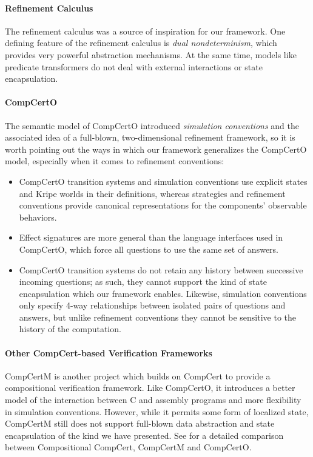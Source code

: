 \documentclass[acmsmall,nonacm]{acmart}
\begin{document}
\paragraph{Refinement Calculus}

The refinement calculus \cite{refcal} was a source of inspiration for our framework.
One defining feature of the refinement calculus is \emph{dual nondeterminism},
which provides very powerful abstraction mechanisms.
At the same time, models like predicate transformers
do not deal with external interactions or state encapsulation.

\paragraph{CompCertO}

The semantic model of CompCertO introduced \emph{simulation conventions}
and the associated idea of a full-blown, two-dimensional refinement framework,
so it is worth pointing out the ways in which our framework generalizes the CompCertO model,
especially when it comes to refinement conventions:
\begin{itemize}
  \item CompCertO transition systems and simulation conventions use
    explicit states and Kripe worlds in their definitions,
    whereas strategies and refinement conventions provide canonical representations
    for the components' observable behaviors.
  \item
    Effect signatures are more general than the language interfaces used in CompCertO,
    which force all questions to use the same set of answers.
  \item
    CompCertO transition systems do not retain any history between successive incoming questions;
    as such, they cannot support the kind of state encapsulation which our framework enables.
    Likewise, simulation conventions only specify 4-way relationships
    between isolated pairs of questions and answers,
    but unlike refinement conventions they cannot be sensitive to the history of the computation.
\end{itemize}

\paragraph{Other CompCert-based Verification Frameworks} %

CompCertM \cite{compcertm} is another project
which builds on CompCert
to provide a compositional verification framework.
Like CompCertO,
it introduces a better model of the interaction between
C and assembly programs
and more flexibility in simulation conventions.
However, while it permits some form of localized state,
CompCertM still does not support
full-blown data abstraction and state encapsulation
of the kind we have presented.
See \citet{compcerto}
for a detailed comparison between Compositional CompCert,
CompCertM and CompCertO.
\end{document}
